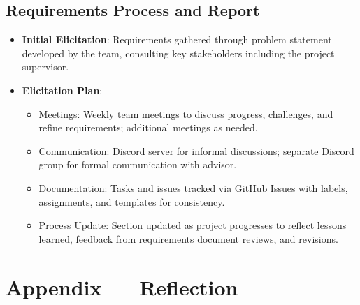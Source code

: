 \documentclass{article}
\begin{document}
\subsection{Requirements Process and Report}\label{subsec:reqprocess}
\begin{itemize}
    \item \textbf{Initial Elicitation}: Requirements gathered through problem statement developed by the team, consulting key stakeholders including the project supervisor.
    \item \textbf{Elicitation Plan}:
    \begin{itemize}
        \item Meetings: Weekly team meetings to discuss progress, challenges, and refine requirements; additional meetings as needed.
        \item Communication: Discord server for informal discussions; separate Discord group for formal communication with advisor.
        \item Documentation: Tasks and issues tracked via GitHub Issues with labels, assignments, and templates for consistency.
        \item Process Update: Section updated as project progresses to reflect lessons learned, feedback from requirements document reviews, and revisions.
    \end{itemize}
\end{itemize}

\newpage{}



\section*{Appendix --- Reflection}

\end{document}
